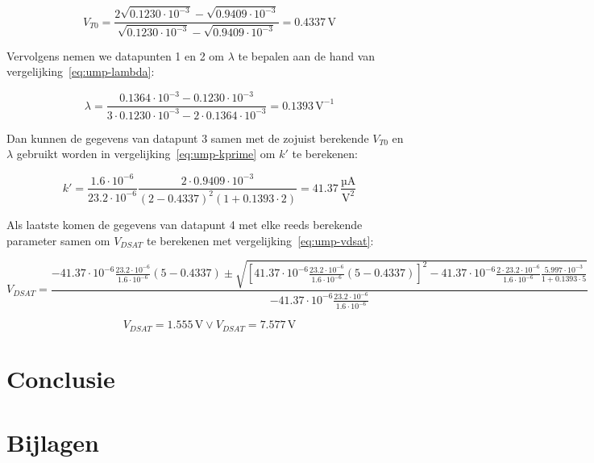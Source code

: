 \documentclass{article}
\begin{document}
\begin{equation} \label{ump-vt0-num}
	V_{T0} = \frac{2\sqrt{0.1230 \cdot 10^{-3}} - \sqrt{0.9409 \cdot 10^{-3}}}{\sqrt{0.1230 \cdot 10^{-3}} - \sqrt{0.9409 \cdot 10^{-3}}} = 0.4337 \, \textrm{V}
\end{equation}

Vervolgens nemen we datapunten 1 en 2 om $\lambda$ te bepalen aan de hand van vergelijking~\ref{eq:ump-lambda}:

\begin{equation} \label{ump-lambda-num}
	\lambda = \frac{0.1364 \cdot 10^{-3} - 0.1230 \cdot 10^{-3}}{3 \cdot 0.1230 \cdot 10^{-3} - 2 \cdot 0.1364 \cdot 10^{-3}} = 0.1393 \, \textrm{V}^{-1}
\end{equation}

Dan kunnen de gegevens van datapunt 3 samen met de zojuist berekende $V_{T0}$ en $\lambda$ gebruikt worden in vergelijking~\ref{eq:ump-kprime} om $k'$ te berekenen:

\begin{equation} \label{eq:ump-kprime-num}
	k' = \frac{1.6 \cdot 10^{-6}}{23.2 \cdot 10^{-6}}\frac{2 \cdot 0.9409 \cdot 10^{-3}}{(2 - 0.4337)^2(1 + 0.1393 \cdot 2)} = 41.37 \,\frac{\textrm{µA}}{\textrm{V}^{2}}
\end{equation}

Als laatste komen de gegevens van datapunt 4 met elke reeds berekende parameter samen om $V_{DSAT}$ te berekenen met vergelijking~\ref{eq:ump-vdsat}:

\begin{equation} \label{eq:ump-vdsat-num}
	V_{DSAT} = \frac{-41.37 \cdot 10^{-6} \frac{23.2 \cdot 10^{-6}}{1.6 \cdot 10^{-6}}(5-0.4337) \pm \sqrt{[41.37 \cdot 10^{-6}\frac{23.2 \cdot 10^{-6}}{1.6 \cdot 10^{-6}}(5-0.4337)]^2 - 41.37 \cdot 10^{-6}\frac{2 \cdot 23.2 \cdot 10^{-6}}{1.6 \cdot 10^{-6}}\frac{5.997 \cdot 10^{-3}}{1 + 0.1393 \cdot 5}}}{-41.37 \cdot 10^{-6}\frac{23.2 \cdot 10^{-6}}{1.6 \cdot 10^{-6}}}	
\end{equation}

$$V_{DSAT} = 1.555 \, \textrm{V} \vee V_{DSAT} = 7.577 \, \textrm{V}$$

\section{Conclusie}
\label{sec:ump-conclusie}

\printbibliography

\section{Bijlagen}
\label{sec:ump-bijlagen}
\end{document}
